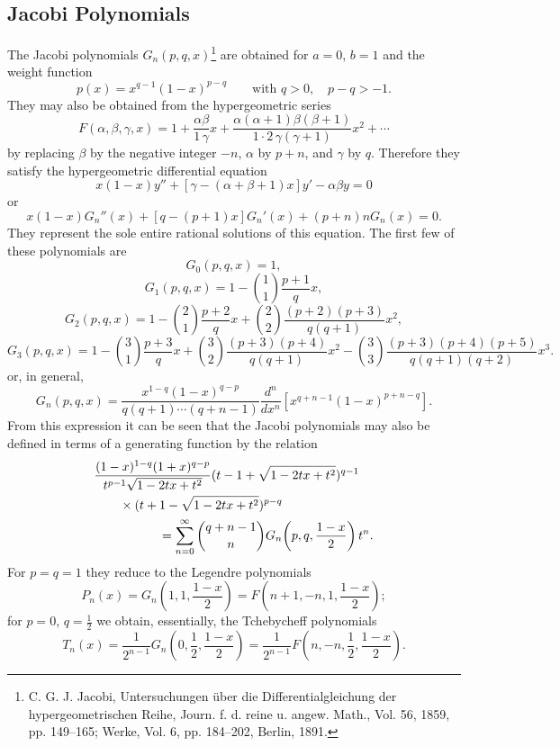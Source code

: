 \subsection{Jacobi Polynomials}
The Jacobi polynomials $G_n(p,q,x)$\footnote{C. G. J. Jacobi, Untersuchungen \"uber die Differentialgleichung der hypergeometrischen Reihe, Journ. f. d. reine u. angew. Math., Vol. 56, 1859, pp. 149--165; Werke, Vol. 6, pp. 184--202, Berlin, 1891.} are obtained for $a=0$, $b=1$ and the weight function
\[
p(x)=x^{q-1}(1-x)^{p-q}\qquad\text{with }q>0,\quad p-q>-1.
\]
They may also be obtained from the hypergeometric series
\begin{equation}
F(\alpha,\beta,\gamma,x)=1+\frac{\alpha\beta}{1\,\gamma}x
+\frac{\alpha(\alpha+1)\beta(\beta+1)}{1\cdot2\,\gamma(\gamma+1)}x^2+\cdots
\tag{24}
\end{equation}
by replacing $\beta$ by the negative integer $-n$, $\alpha$ by $p+n$, and $\gamma$ by $q$. Therefore they satisfy the hypergeometric differential equation
\begin{equation}
x(1-x)y''+[\gamma-(\alpha+\beta+1)x]y'-\alpha\beta y=0
\tag{25}
\end{equation}
or
\begin{equation}
x(1-x)G_n''(x)+[q-(p+1)x]G_n'(x)+(p+n)nG_n(x)=0.
\tag{25'}
\end{equation}
They represent the sole entire rational solutions of this equation. The first few of these polynomials are
\[
G_0(p,q,x)=1,
\]
\[
G_1(p,q,x)=1-\binom11\frac{p+1}{q}x,
\]
\[
G_2(p,q,x)=1-\binom21\frac{p+2}{q}x
+\binom22\frac{(p+2)(p+3)}{q(q+1)}x^2,
\]
\[
G_3(p,q,x)=1-\binom31\frac{p+3}{q}x
+\binom32\frac{(p+3)(p+4)}{q(q+1)}x^2
-\binom33\frac{(p+3)(p+4)(p+5)}{q(q+1)(q+2)}x^3.
\]
or, in general,
\[
G_n(p,q,x)=\frac{x^{1-q}(1-x)^{q-p}}{q(q+1)\cdots(q+n-1)}
\frac{d^n}{dx^n}\left[x^{q+n-1}(1-x)^{p+n-q}\right].
\]
From this expression it can be seen that the Jacobi polynomials may also be defined in terms of a generating function by the relation
\[
\begin{aligned}
&\frac{(1-x)^{1-q}(1+x)^{q-p}}
{t^{p-1}\sqrt{1-2tx+t^2}}
(t-1+\sqrt{1-2tx+t^2})^{q-1}\\
&\qquad\times(t+1-\sqrt{1-2tx+t^2})^{p-q}\\
&\hspace{18mm}=\sum_{n=0}^{\infty}\binom{q+n-1}{n}
G_n\!\left(p,q,\frac{1-x}{2}\right)t^n.
\end{aligned}
\]
For $p=q=1$ they reduce to the Legendre polynomials
\begin{equation}
P_n(x)=G_n\!\left(1,1,\frac{1-x}{2}\right)
=F\!\left(n+1,-n,1,\frac{1-x}{2}\right);
\tag{26}
\end{equation}
for $p=0$, $q=\tfrac12$ we obtain, essentially, the Tchebycheff polynomials
\begin{equation}
T_n(x)=\frac{1}{2^{n-1}}G_n\!\left(0,\frac12,\frac{1-x}{2}\right)
=\frac{1}{2^{n-1}}F\!\left(n,-n,\frac12,\frac{1-x}{2}\right).
\tag{27}
\end{equation}

